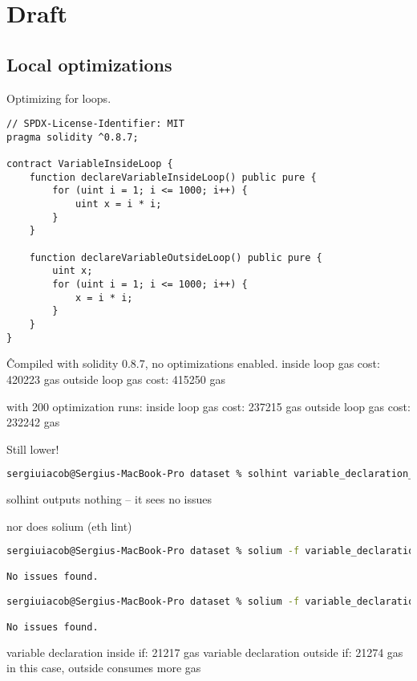 \chapter*{Draft} 

\section{Local optimizations}
Optimizing for loops.

\begin{lstlisting}[language=solidity]
// SPDX-License-Identifier: MIT
pragma solidity ^0.8.7;

contract VariableInsideLoop {
    function declareVariableInsideLoop() public pure {
        for (uint i = 1; i <= 1000; i++) {
            uint x = i * i;
        }
    }

    function declareVariableOutsideLoop() public pure {
        uint x;
        for (uint i = 1; i <= 1000; i++) {
            x = i * i;
        }
    }
}
\end{lstlisting}

\^ Compiled with solidity 0.8.7, no optimizations enabled.
inside loop gas cost: 420223 gas
outside loop gas cost: 415250 gas

with 200 optimization runs:
inside loop gas cost: 237215 gas
outside loop gas cost: 232242 gas

Still lower!

\begin{lstlisting}[language=bash]
sergiuiacob@Sergius-MacBook-Pro dataset % solhint variable_declaration_loops.sol

\end{lstlisting}

solhint outputs nothing – it sees no issues

nor does solium (eth lint)


\begin{lstlisting}[language=bash]
sergiuiacob@Sergius-MacBook-Pro dataset % solium -f variable_declaration_loops.sol

No issues found.

sergiuiacob@Sergius-MacBook-Pro dataset % solium -f variable_declaration_if.sol

No issues found.

\end{lstlisting}


variable declaration inside if: 21217 gas
variable declaration outside if: 21274 gas
in this case, outside consumes more gas

